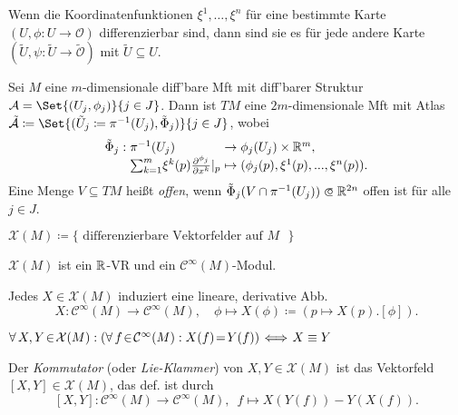 \documentclass{cheat-sheet}
\renewcommand{\O}{\mathcal{O}} %
\newcommand{\A}{\mathcal{A}} %
\newcommand{\Cont}{\mathcal{C}} %
\newcommand{\VF}{\mathcal{X}} %
\begin{document}
\begin{lem}
  Wenn die Koordinatenfunktionen $\xi^1, \ldots, \xi^n$ für eine bestimmte Karte $(U, \phi : U \to \O)$ differenzierbar sind, dann sind sie es für jede andere Karte $(\tilde{U}, \psi : \tilde{U} \to \tilde{\O})$ mit $\tilde{U} \subseteq U$.
\end{lem}

\begin{defn}
  Sei $M$ eine $m$-dimensionale diff'bare Mft mit diff'barer Struktur $\A = \Set{(U_j, \phi_j)}{j \in J}$. Dann ist $TM$ eine $2m$-dimensionale Mft mit Atlas $\tilde{\A} \coloneqq \Set{(\tilde{U}_j \coloneqq \pi^{-1}(U_j), \tilde{\Phi}_j)}{j \in J}$, wobei
  \[
    \arraycolsep=1.5pt
    \begin{array}{rll}
      \tilde{\Phi}_j : & \pi^{-1}(U_j) & \to \phi_j(U_j) \times \R^m, \\
      & {\sum}_{k=1}^m \xi^k(p) \tfrac{\partial^{\phi_j}}{\partial x^k}|_p & \mapsto (\phi_j(p), \xi^1(p), \nldots, \xi^n(p)).
    \end{array}
  \]
  Eine Menge $V \subseteq TM$ heißt \textit{offen}, wenn $\tilde{\Phi}_j(V \cap \pi^{-1}(U_j)) \opn \R^{2n}$ offen ist für alle $j \in J$.
\end{defn}

\begin{nota}
  $\VF(M) \coloneqq \{\text{ differenzierbare Vektorfelder auf $M$ }\}$
\end{nota}

\begin{bem}
  $\VF(M)$ ist ein $\mathbb{R}$-VR und ein $\Cont^\infty(M)$-Modul.
\end{bem}

\begin{lem}
  Jedes $X \in \VF(M)$ induziert eine lineare, derivative Abb.
  \[
    X : \Cont^\infty(M) \to \Cont^\infty(M), \quad
    \phi \mapsto X(\phi) \coloneqq (p \mapsto X(p) . [\phi]).
  \]
\end{lem}

\begin{lem}
  $\fa{X, Y \!\in\! \VF(M)\!}\! (\fa{f \!\in\! \Cont^\infty(M)\!}\! X(f) \!=\! Y(f)) \!\iff\! X \equiv Y$
\end{lem}

\begin{lemdefn}
  Der \emph{Kommutator} (oder \emph{Lie-Klammer}) von $X, Y \!\in\! \VF(M)$ ist das Vektorfeld $[X, Y] \in \VF(M)$, das def. ist durch
  \[
    [X, Y] : \Cont^\infty(M) \to \Cont^\infty(M), \enspace
    f \mapsto X(Y(f)) - Y(X(f)).
  \]
\end{lemdefn}
\end{document}
